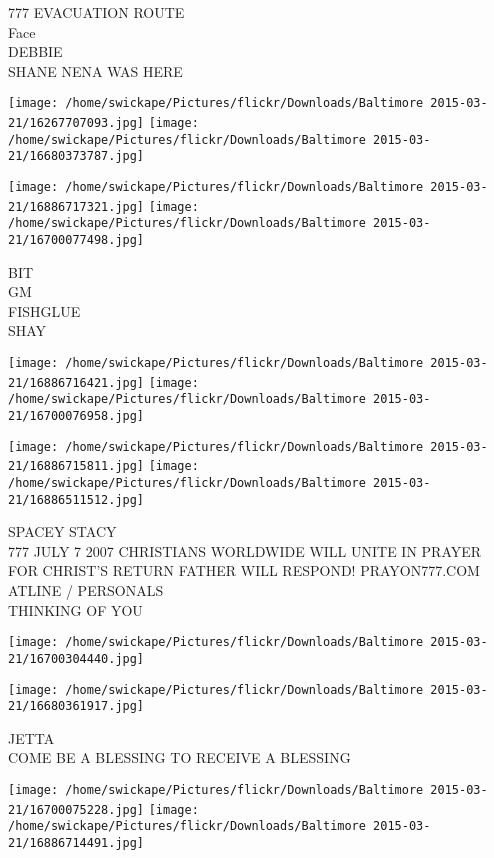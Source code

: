 \documentclass[10pt,letterpaper]{article}
\begin{document}
777 EVACUATION ROUTE\\
Face\\
DEBBIE\\
SHANE NENA WAS HERE\\
\pagebreak

\texttt{[image: /home/swickape/Pictures/flickr/Downloads/Baltimore 2015-03-21/16267707093.jpg]}
\texttt{[image: /home/swickape/Pictures/flickr/Downloads/Baltimore 2015-03-21/16680373787.jpg]}

\texttt{[image: /home/swickape/Pictures/flickr/Downloads/Baltimore 2015-03-21/16886717321.jpg]}
\texttt{[image: /home/swickape/Pictures/flickr/Downloads/Baltimore 2015-03-21/16700077498.jpg]}

BIT\\
GM\\
FISHGLUE\\
SHAY\\
\pagebreak

\texttt{[image: /home/swickape/Pictures/flickr/Downloads/Baltimore 2015-03-21/16886716421.jpg]}
\texttt{[image: /home/swickape/Pictures/flickr/Downloads/Baltimore 2015-03-21/16700076958.jpg]}

\texttt{[image: /home/swickape/Pictures/flickr/Downloads/Baltimore 2015-03-21/16886715811.jpg]}
\texttt{[image: /home/swickape/Pictures/flickr/Downloads/Baltimore 2015-03-21/16886511512.jpg]}

SPACEY STACY\\
777 JULY 7 2007 CHRISTIANS WORLDWIDE WILL UNITE IN PRAYER FOR CHRIST'S RETURN FATHER WILL RESPOND! PRAYON777.COM\\
ATLINE / PERSONALS\\
THINKING OF YOU\\
\pagebreak

\texttt{[image: /home/swickape/Pictures/flickr/Downloads/Baltimore 2015-03-21/16700304440.jpg]}

\vspace{0.25in}
\texttt{[image: /home/swickape/Pictures/flickr/Downloads/Baltimore 2015-03-21/16680361917.jpg]}

JETTA\\
COME BE A BLESSING TO RECEIVE A BLESSING\\
\pagebreak

\texttt{[image: /home/swickape/Pictures/flickr/Downloads/Baltimore 2015-03-21/16700075228.jpg]}
\texttt{[image: /home/swickape/Pictures/flickr/Downloads/Baltimore 2015-03-21/16886714491.jpg]}
\end{document}
